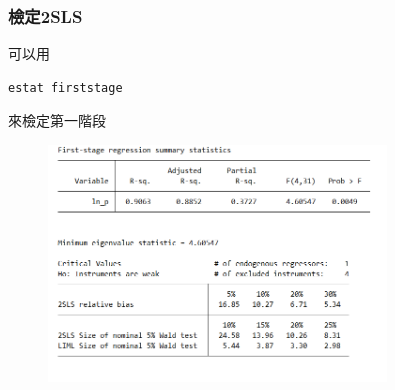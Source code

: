 \begin{frame}[fragile]
    \frametitle{檢定2SLS}
可以用
\begin{lstlisting}
estat firststage \end{lstlisting}
來檢定第一階段
    
    \begin{figure}
        \includegraphics[width=0.8\textwidth]{fig/result_11-11-e.png}
    \end{figure}

\end{frame}
